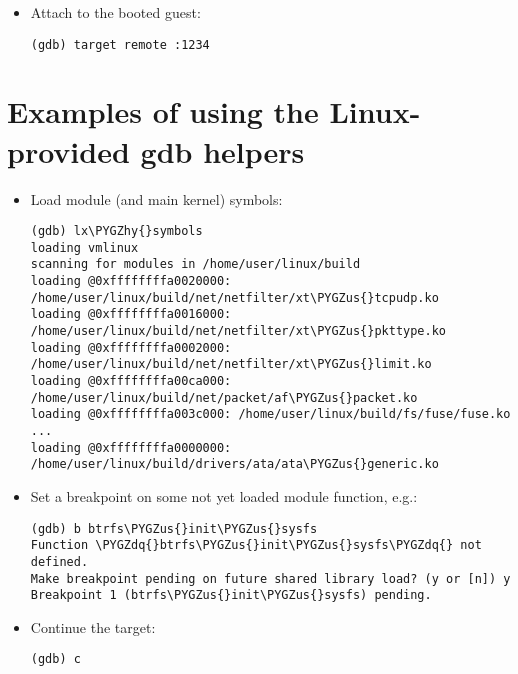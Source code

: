 \documentclass[a4paper,8pt,english]{sphinxmanual}
\def\PYGZus{\char`\_}
\def\PYGZhy{\char`\-}
\def\PYGZdq{\char`\"}
\begin{document}
\begin{itemize}
to \textasciitilde{}/.gdbinit. See gdb help for more details.

\item {} 
Attach to the booted guest:

\begin{Verbatim}[commandchars=\\\{\}]
(gdb) target remote :1234
\end{Verbatim}

\end{itemize}


\section{Examples of using the Linux-provided gdb helpers}
\label{dev-tools/gdb-kernel-debugging:examples-of-using-the-linux-provided-gdb-helpers}\begin{itemize}
\item {} 
Load module (and main kernel) symbols:

\begin{Verbatim}[commandchars=\\\{\}]
(gdb) lx\PYGZhy{}symbols
loading vmlinux
scanning for modules in /home/user/linux/build
loading @0xffffffffa0020000: /home/user/linux/build/net/netfilter/xt\PYGZus{}tcpudp.ko
loading @0xffffffffa0016000: /home/user/linux/build/net/netfilter/xt\PYGZus{}pkttype.ko
loading @0xffffffffa0002000: /home/user/linux/build/net/netfilter/xt\PYGZus{}limit.ko
loading @0xffffffffa00ca000: /home/user/linux/build/net/packet/af\PYGZus{}packet.ko
loading @0xffffffffa003c000: /home/user/linux/build/fs/fuse/fuse.ko
...
loading @0xffffffffa0000000: /home/user/linux/build/drivers/ata/ata\PYGZus{}generic.ko
\end{Verbatim}

\item {} 
Set a breakpoint on some not yet loaded module function, e.g.:

\begin{Verbatim}[commandchars=\\\{\}]
(gdb) b btrfs\PYGZus{}init\PYGZus{}sysfs
Function \PYGZdq{}btrfs\PYGZus{}init\PYGZus{}sysfs\PYGZdq{} not defined.
Make breakpoint pending on future shared library load? (y or [n]) y
Breakpoint 1 (btrfs\PYGZus{}init\PYGZus{}sysfs) pending.
\end{Verbatim}

\item {} 
Continue the target:

\begin{Verbatim}[commandchars=\\\{\}]
(gdb) c
\end{Verbatim}


\end{itemize}
\end{document}
